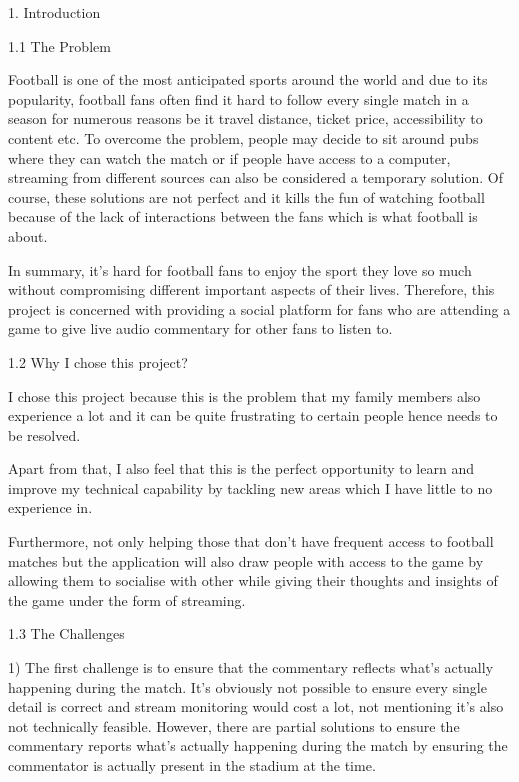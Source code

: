 \documentclass{article}
\begin{document}
\begin{flushleft}
{\huge 1. Introduction} \par
{\Large1.1 The Problem} \par
Football is one of the most anticipated sports around the world and due to its popularity, football fans often find it hard to follow every single match in a season for numerous reasons be it travel distance, ticket price, accessibility to content etc. To overcome the problem, people may decide to sit around pubs where they can watch the match or if people have access to a computer, streaming from different sources can also be considered a temporary solution. Of course, these solutions are not perfect and it kills the fun of watching football because of the lack of interactions between the fans which is what football is about.\par
In summary, it's hard for football fans to enjoy the sport they love so much without compromising different important aspects of their lives. Therefore, this project is concerned with providing a social platform for fans who are attending a game to give live audio commentary for other fans to listen to.\par
{\Large 1.2 Why I chose this project?} \par
I chose this project because this is the problem that my family members also experience a lot and it can be quite frustrating to certain people hence needs to be resolved.\par
Apart from that, I also feel that this is the perfect opportunity to learn and improve my technical capability by tackling new areas which I have little to no experience in.\par
Furthermore, not only helping those that don't have frequent access to football matches but the application will also draw people with access to the game by allowing them to socialise with other while giving their thoughts and insights of the game under the form of streaming.\par
{\Large 1.3 The Challenges} \par
1) The first challenge is to ensure that the commentary reflects what's actually happening during the match. It's obviously not possible to ensure every single detail is correct and stream monitoring would cost a lot, not mentioning it's also not technically feasible. However, there are partial solutions to ensure the commentary reports what's actually happening during the match by ensuring the commentator is actually present in the stadium at the time.\par

\end{flushleft}
\end{document}
